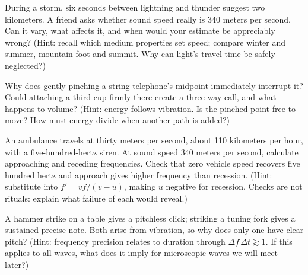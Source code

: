 \begin{puzzles}
\item During a storm, six seconds between lightning and thunder suggest two kilometers. A friend asks whether sound speed really is 340 meters per second. Can it vary, what affects it, and when would your estimate be appreciably wrong? (Hint: recall which medium properties set speed; compare winter and summer, mountain foot and summit. Why can light's travel time be safely neglected?)

\item Why does gently pinching a string telephone's midpoint immediately interrupt it? Could attaching a third cup firmly there create a three-way call, and what happens to volume? (Hint: energy follows vibration. Is the pinched point free to move? How must energy divide when another path is added?)

\item An ambulance travels at thirty meters per second, about 110 kilometers per hour, with a five-hundred-hertz siren. At sound speed 340 meters per second, calculate approaching and receding frequencies. Check that zero vehicle speed recovers five hundred hertz and approach gives higher frequency than recession. (Hint: substitute into \(f'=vf/(v-u)\), making \(u\) negative for recession. Checks are not rituals: explain what failure of each would reveal.)

\item A hammer strike on a table gives a pitchless click; striking a tuning fork gives a sustained precise note. Both arise from vibration, so why does only one have clear pitch? (Hint: frequency precision relates to duration through \(\Delta f\,\Delta t\gtrsim 1\). If this applies to all waves, what does it imply for microscopic waves we will meet later?)
\end{puzzles}
